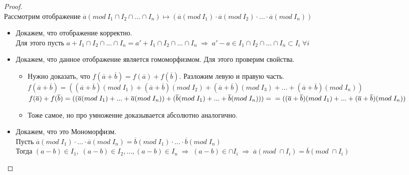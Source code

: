 \documentclass[12pt, a4paper]{article}
\newcommand{\ra}{\;\Rightarrow\;}
\theoremstyle{plain}
\theoremstyle{definition}
\begin{document}
\begin{proof} ~\\
    Рассмотрим отображение $\overline{a}(mod \ I_1\cap I_2 \cap ... \cap I_n) \longmapsto (\overline{a}(mod \ I_1)\cdot \overline{a}(mod \ I_2)\cdot...\cdot \overline{a}(mod \ I_n))$
    \begin{itemize}
        \item Докажем, что отображение корректно. \\
        Для этого пусть $a+I_1\cap I_2 \cap ... \cap I_n = a'+I_1\cap I_2 \cap ... \cap I_n\ra a'-a \in I_1\cap I_2 \cap ... \cap I_n\subset I_i\; \forall i$
        \item Докажем, что данное отображение является гомоморфизмом. Для этого проверим свойства.
        \begin{itemize}
            \item Нужно доказать, что $f(\overline{a}+\overline{b})=f(\overline{a})+f(\overline{b})$. Разложим левую и правую часть.\\
                $f(\overline{a}+\overline{b}) = ((\overline{a}+\overline{b})(mod \; I_1)+(\overline{a}+\overline{b})(mod \; I_2)+(\overline{a}+\overline{b})(mod \; I_3)+...+(\overline{a}+\overline{b})(mod \; I_n
                ))$\\
                $f(\overline{a})+f(\overline{b}) = ((\overline{a}(mod\;I_1)+...+\overline{a}(mod\;I_n))+(\overline{b}(mod\;I_1)+...+\overline{b}(mod\;I_n))) = \\ = 
                ((\overline{a}+\overline{b})(mod \; I_1)+...+(\overline{a}+\overline{b})(mod \; I_n
                ))$
            \item Тоже самое, но про умножение доказывается абсолютно аналогично.
            
        \end{itemize}
        \item Докажем, что это Мономорфизм. \\ Пусть $\overline{a}(mod \; I_1)\cdot...\cdot \overline{a}(mod \; I_n) = \overline{b}(mod \; I_1)\cdot...\cdot \overline{b}(mod \; I_n)$\\
            Тогда \((a-b)\in I_1,\; (a-b)\in I_2,...,(a-b)\in I_n\ra (a-b)\in\cap I_i\ra \overline{a}(mod \; \cap I_i) = \overline{b}(mod \; \cap I_i)\)


\end{itemize}
\end{proof}
\end{document}
